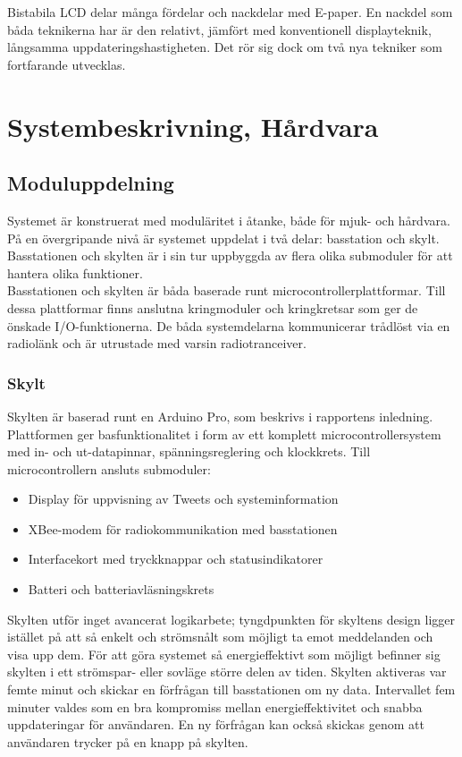 \documentclass[a4paper,11pt]{article}
\begin{document}
Bistabila LCD delar många fördelar och nackdelar med E-paper. En nackdel som båda teknikerna har är den relativt, jämfört med konventionell displayteknik, långsamma uppdateringshastigheten. Det rör sig dock om två nya tekniker som fortfarande utvecklas.

\section{Systembeskrivning, Hårdvara}

\subsection{Moduluppdelning}
Systemet är konstruerat med moduläritet i åtanke, både för mjuk- och hårdvara. På en övergripande nivå är systemet uppdelat i två delar: basstation och skylt. Basstationen och skylten är i sin tur uppbyggda av flera olika submoduler för att hantera olika funktioner. \\

Basstationen och skylten är båda baserade runt microcontrollerplattformar. Till dessa plattformar finns anslutna kringmoduler och kringkretsar som ger de önskade I/O-funktionerna. De båda systemdelarna kommunicerar trådlöst via en radiolänk och är utrustade med varsin radiotranceiver.

\subsubsection{Skylt}
Skylten är baserad runt en Arduino Pro, som beskrivs i rapportens inledning. Plattformen ger basfunktionalitet i form av ett komplett microcontrollersystem med in- och ut-datapinnar, spänningsreglering och klockkrets. Till microcontrollern ansluts submoduler:
	
	\begin{itemize}
    	\item Display för uppvisning av Tweets och systeminformation
    	\item XBee-modem för radiokommunikation med basstationen
    	\item Interfacekort med tryckknappar och statusindikatorer
    	\item Batteri och batteriavläsningskrets
	\end{itemize}
	
Skylten utför inget avancerat logikarbete; tyngdpunkten för skyltens design ligger istället på att så enkelt och strömsnålt som möjligt ta emot meddelanden och visa upp dem. För att göra systemet så energieffektivt som möjligt befinner sig skylten i ett strömspar- eller sovläge större delen av tiden. Skylten aktiveras var femte minut och skickar en förfrågan till basstationen om ny data. Intervallet fem minuter valdes som en bra kompromiss mellan energieffektivitet och snabba uppdateringar för användaren. En ny förfrågan kan också skickas genom att användaren trycker på en knapp på skylten.\\
\end{document}
